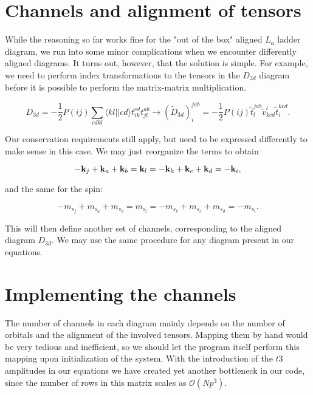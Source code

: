 \section{Channels and alignment of tensors}

While the reasoning so far works fine for the "out of the box" aligned $L_a$ ladder diagram, we run into some minor complications when we encounter differently aligned diagrams. It turns out, however, that the solution is simple. For example, we need to perform index transformations to the tensors in  the $D_{3d}$ diagram before it is possible to perform the matrix-matrix multiplication. 

\begin{equation}
D_{3d}= -\frac{1}{2} P(ij) \sum_{cdkl} \langle kl \vert \vert cd \rangle t_{ik}^{cd} t_{jl}^{ab} \rightarrow (\tilde{D}_{3d})^{jab}_{i} =  -\frac{1}{2} P(ij) \tilde{t}^{jab}_l \tilde{v}_{kcd}^{l}  \tilde{t}^{kcd}_i.
\end{equation}

Our conservation requirements still apply, but need to be expressed differently to make sense in this case. We may just reorganize the terms to obtain

\begin{equation}
- \bold{k}_j + \bold{k}_a + \bold{k}_b = \bold{k}_l = -\bold{k}_k + \bold{k}_c + \bold{k}_d = -\bold{k}_i,
\end{equation}

and the same for the spin:

\begin{equation}
- m_{s_j} + m_{s_a} + m_{s_b} = m_{s_l} = -m_{s_k} + m_{s_c} + m_{s_d} = -m_{s_i}.
\end{equation}

This will then define another set of channels, corresponding to the aligned diagram $D_{3d}$. We may use the same procedure for any diagram present in our equations.

\section{Implementing the channels}

The number of channels in each diagram mainly depends on the number of orbitals and the alignment of the involved tensors. Mapping them by hand would be very tedious and inefficient, so we should let the program itself perform this mapping upon initialization of the system. With the introduction of the $t3$ amplitudes in our equations we have created yet another bottleneck in our code, since the number of rows in this matrix scales as $\mathcal{O}(Np^3)$.

